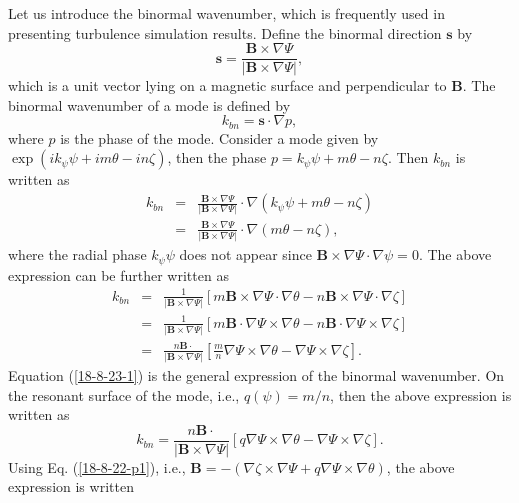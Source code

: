 \documentclass{llncs}
\begin{document}
Let us introduce the binormal wavenumber, which is frequently used in
presenting turbulence simulation results. Define the binormal direction
$\mathbf{s}$ by
\[ \mathbf{s}= \frac{\mathbf{B} \times \nabla \Psi}{| \mathbf{B} \times \nabla
   \Psi |}, \]
which is a unit vector lying on a magnetic surface and perpendicular to
$\mathbf{B}$. The binormal wavenumber of a mode is defined by
\begin{equation}
  \label{18-5-4-p2} k_{b n} =\mathbf{s} \cdot \nabla p,
\end{equation}
where $p$ is the phase of the mode. Consider a mode given by $\exp (i k_{\psi}
\psi + i m \theta - i n \zeta)$, then the phase $p = k_{\psi} \psi + m \theta
- n \zeta$. Then $k_{b n}$ is written as
\begin{eqnarray}
  k_{b n} & = & \frac{\mathbf{B} \times \nabla \Psi}{| \mathbf{B} \times
  \nabla \Psi |} \cdot \nabla (k_{\psi} \psi + m \theta - n \zeta) \nonumber\\
  & = & \frac{\mathbf{B} \times \nabla \Psi}{| \mathbf{B} \times \nabla \Psi
  |} \cdot \nabla (m \theta - n \zeta), 
\end{eqnarray}
where the radial phase $k_{\psi} \psi$ does not appear since $\mathbf{B}
\times \nabla \Psi \cdot \nabla \psi = 0$. The above expression can be further
written as
\begin{eqnarray}
  k_{b n} & = & \frac{1}{| \mathbf{B} \times \nabla \Psi |} [m\mathbf{B}
  \times \nabla \Psi \cdot \nabla \theta - n\mathbf{B} \times \nabla \Psi
  \cdot \nabla \zeta] \nonumber\\
  & = & \frac{1}{| \mathbf{B} \times \nabla \Psi |} [m\mathbf{B} \cdot \nabla
  \Psi \times \nabla \theta - n\mathbf{B} \cdot \nabla \Psi \times \nabla
  \zeta] \nonumber\\
  & = & \frac{n\mathbf{B} \cdot}{| \mathbf{B} \times \nabla \Psi |} \left[
  \frac{m}{n} \nabla \Psi \times \nabla \theta - \nabla \Psi \times \nabla
  \zeta \right] .  \label{18-8-23-1}
\end{eqnarray}
Equation (\ref{18-8-23-1}) is the general expression of the binormal
wavenumber. On the resonant surface of the mode, i.e., $q (\psi) = m / n$,
then the above expression is written as
\begin{equation}
  k_{b n} = \frac{n\mathbf{B} \cdot}{| \mathbf{B} \times \nabla \Psi |} [q
  \nabla \Psi \times \nabla \theta - \nabla \Psi \times \nabla \zeta] .
\end{equation}
Using Eq. (\ref{18-8-22-p1}), i.e., $\mathbf{B}= - (\nabla \zeta \times \nabla
\Psi + q \nabla \Psi \times \nabla \theta)$, the above expression is written
\end{document}
